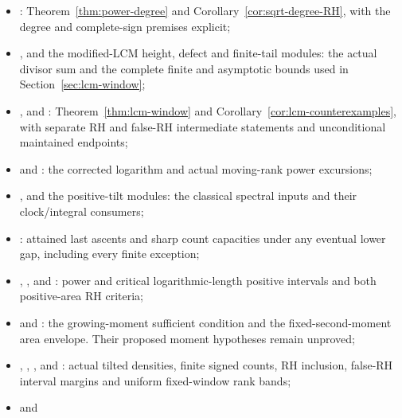\documentclass[11pt]{article}
\theoremstyle{definition}
\begin{document}
\begin{itemize}
the exact root law, finite correction bounds, and
Theorem~\ref{thm:log-root-sign};
\item {}:
Theorem~\ref{thm:power-degree} and Corollary~\ref{cor:sqrt-degree-RH},
with the degree and complete-sign premises explicit;
\item {},
 and the modified-LCM
height, defect and finite-tail modules: the actual divisor sum and
the complete finite and asymptotic bounds used in
Section~\ref{sec:lcm-window};
\item {},
 and
:
Theorem~\ref{thm:lcm-window} and Corollary~\ref{cor:lcm-counterexamples},
with separate RH and false-RH intermediate statements and
unconditional maintained endpoints;
\item {} and
: the corrected
logarithm and actual moving-rank power excursions;
\item {},
 and the positive-tilt
modules: the classical spectral inputs and their clock/integral
consumers;
\item {}: attained last
ascents and sharp count capacities under any eventual lower gap,
including every finite exception;
\item {},
,
 and
: power and critical
logarithmic-length positive intervals and both positive-area RH criteria;
\item {} and
: the growing-moment sufficient
condition and the fixed-second-moment area envelope. Their proposed
moment hypotheses remain unproved;
\item {},
,
,
 and
: actual tilted densities,
finite signed counts, RH inclusion, false-RH interval margins and
uniform fixed-window rank bands;
\item {} and

\end{itemize}
\end{document}
